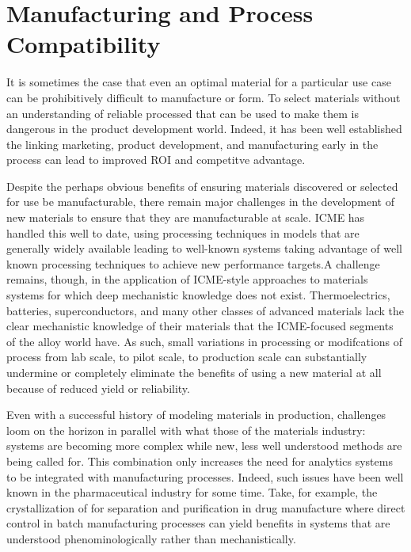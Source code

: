 \section{Manufacturing and Process Compatibility}
It is sometimes the case that even an optimal material for a particular use case can be prohibitively difficult to manufacture or form. To select materials without an understanding of reliable processed that can be used to make them is dangerous in the product development world. Indeed, it has been well established the linking marketing, product development, and manufacturing early in the process can lead to improved ROI and competitve advantage\cite{Swink2007203}.

Despite the perhaps obvious benefits of ensuring materials discovered or selected for use be manufacturable, there remain major challenges in the development of new materials to ensure that they are manufacturable at scale. ICME has handled this well to date, using processing techniques in models that are generally widely available leading to well-known systems taking advantage of well known processing techniques to achieve new performance targets.A challenge remains, though, in the application of ICME-style approaches to materials systems for which deep mechanistic knowledge does not exist. Thermoelectrics, batteries, superconductors, and many other classes of advanced materials lack the clear mechanistic knowledge of their materials that the ICME-focused segments of the alloy world have. As such, small variations in processing or modifcations of process from lab scale, to pilot scale, to production scale can substantially undermine or completely eliminate the benefits of using a new material at all because of reduced yield or reliability.

Even with a successful history of modeling materials in production, challenges loom on the horizon in parallel with what those of the materials industry: systems are becoming more complex while new, less well understood methods are being called for. This combination only increases the need for analytics systems to be integrated with manufacturing processes\cite{JPS:JPS24594}. Indeed, such issues have been well known in the pharmaceutical industry for some time. Take, for example, the crystallization of for separation and purification in drug manufacture where direct control in batch manufacturing processes can yield benefits in systems that are understood phenominologically rather than mechanistically\cite{Fujiwara2005493}.

